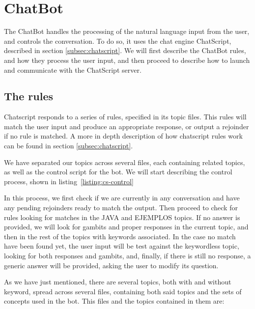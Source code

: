 \section{ChatBot}
\label{sec:chatbot}

The ChatBot handles the processing of the natural language input from the user, and controls the conversation. To do so, it uses the chat engine ChatScript, described in section \ref{subsec:chatscript}. We will first describe the ChatBot rules, and how they process the user input, and then proceed to describe how to launch and communicate with the ChatScript server.

\subsection{The rules}

Chatscript responds to a series of rules, specified in its topic files. This rules will match the user input and produce an appropriate response, or output a rejoinder if no rule is matched. A more in depth description of how chatscript rules work can be found in section \ref{subsec:chatscript}.

We have separated our topics across several files, each containing related topics, as well as the control script for the bot. We will start describing the control process, shown in listing~\ref{listing:cs-control}

\begin{center}
  
\end{center}

In this process, we first check if we are currently in any conversation and have any pending rejoinders ready to match the output. Then proceed to check for rules looking for matches in the JAVA and EJEMPLOS topics. If no answer is provided, we will look for gambits and proper responses in the current topic, and then in the rest of the topics with keywords associated. In the case no match have been found yet, the user input will be test against the keywordless topic, looking for both responses and gambits, and, finally, if there is still no response, a generic answer will be provided, asking the user to modify its question.

As we have just mentioned, there are several topics, both with and without keyword, spread across several files, containing both said topics and the sets of concepts used in the bot. This files and the topics contained in them are:

